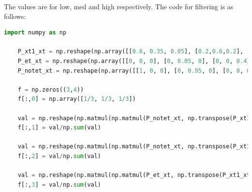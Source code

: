 \documentclass[letter, 9pt]{article}
\begin{document}
The values are for low, med and high respectively. The code for filtering is as follows:
\begin{lstlisting}[language=Python]
    import numpy as np
    
    P_xt1_xt = np.reshape(np.array([[0.6, 0.35, 0.05], [0.2,0.6,0.2], [0,0.5,0.5]]),(3,3))
    P_et_xt = np.reshape(np.array([[0, 0, 0], [0, 0.05, 0], [0, 0, 0.4]]), (3, 3))
    P_notet_xt = np.reshape(np.array([[1, 0, 0], [0, 0.95, 0], [0, 0, 0.6]]), (3, 3))
    
    f = np.zeros((3,4))
    f[:,0] = np.array([1/3, 1/3, 1/3])
    
    val = np.reshape(np.matmul(np.matmul(P_notet_xt, np.transpose(P_xt1_xt)), f[:, 0]), (3))
    f[:,1] = val/np.sum(val)
    
    val = np.reshape(np.matmul(np.matmul(P_notet_xt, np.transpose(P_xt1_xt)), f[:,1]), (3))
    f[:,2] = val/np.sum(val)
    
    val = np.reshape(np.matmul(np.matmul(P_et_xt, np.transpose(P_xt1_xt)), f[:,2]), (3))
    f[:,3] = val/np.sum(val)
\end{lstlisting}

\newpage
\end{document}
